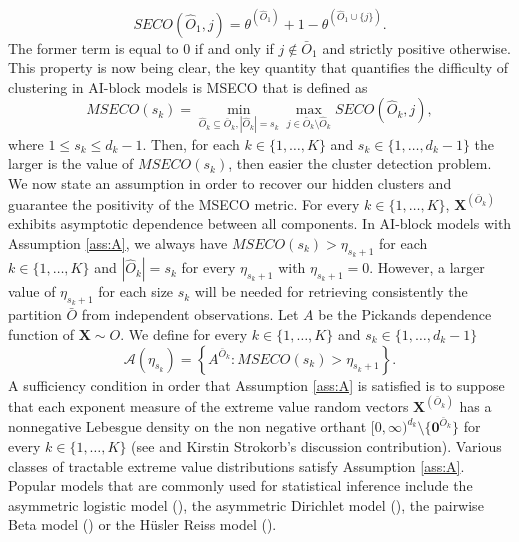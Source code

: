 \documentclass[11pt]{article}
\newenvironment{Assumption}[1]
  {\renewcommand\theinnerassumption{#1}\innerassumption}
  {\endinnerassumption}
\begin{document}
	\begin{equation}
		\label{eq:SECO}
		SECO(\hat{O}_1, j) = \theta^{(\hat{O}_1)} + 1 - \theta^{(\hat{O}_1 \cup \{j\})}.
	\end{equation}
	The former term is equal to $0$ if and only if $j \notin \bar{O}_1$ and strictly positive otherwise. This property is now being clear, the key quantity that quantifies the difficulty of clustering in AI-block models is MSECO that is defined as
	\begin{equation}
		\label{eq:MSECO}
		MSECO(s_k) = \underset{\hat{O}_k \subseteq \bar{O}_k , |\hat{O}_k| = s_k} {\min} \underset{j \in \bar{O}_k \setminus \hat{O}_k}{\max} SECO(\hat{O}_k, j),
	\end{equation}
	where $1 \leq s_k \leq d_k-1$. Then, for each $k \in \{1,\dots,K\}$ and $s_k \in \{1, \dots, d_k-1\}$ the larger is the value of $MSECO(s_k)$, then easier the cluster detection problem. We now state an assumption in order to recover our hidden clusters and guarantee the positivity of the MSECO metric. 
	\begin{Assumption}
		A For every $k \in \{1,\dots, K\}$, $\textbf{X}^{(\bar{O}_k)}$ exhibits asymptotic dependence between all components.
		\label{ass:A}
	\end{Assumption}
	In AI-block models with Assumption \ref{ass:A}, we always have $MSECO(s_k) > \eta_{s_k +1}$ for each $k \in \{1,\dots,K\}$ and $|\hat{O}_k| = s_k$ for every $\eta_{s_k+1}$ with $\eta_{s_k +1} = 0$. However, a larger value of $\eta_{s_k+1}$ for each size $s_k$ will be needed for retrieving consistently the partition $\bar{O}$ from independent observations. Let $A$ be the Pickands dependence function of $\textbf{X} \sim O$. We define for every $k \in \{1,\dots,K\}$ and $s_k \in \{1,\dots, d_k-1\}$
	\begin{equation*}
		\mathcal{A}(\eta_{s_k}) = \left\{ A^{\bar{O}_k} : MSECO(s_k) > \eta_{s_k+1} \right\}.
	\end{equation*}
	A sufficiency condition in order that Assumption \ref{ass:A} is satisfied is to suppose that each exponent measure of the extreme value random vectors $\textbf{X}^{(\bar{O}_k)}$ has a nonnegative Lebesgue density on the non negative orthant $[0,\infty)^{d_k} \setminus \{\textbf{0}^{\bar{O}_k}\}$ for every $k \in \{1, \dots, K\}$ (see \cite{engelke2020graphical} and Kirstin Strokorb's discussion contribution). Various classes of tractable extreme value distributions satisfy Assumption \ref{ass:A}. Popular models that are commonly used for statistical inference include the asymmetric logistic model (\cite{10.1093/biomet/77.2.245}), the asymmetric Dirichlet model (\cite{10.2307/2345748}), the pairwise Beta model (\cite{COOLEY20102103}) or the Hüsler Reiss model (\cite{HUSLER1989283}).
\end{document}
